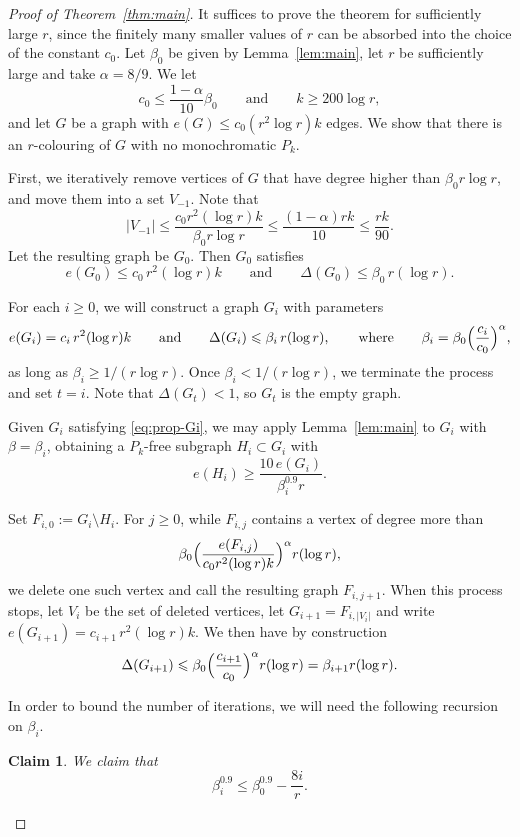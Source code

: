\documentclass[12pt,reqno]{amsart}
\newtheorem{claim}[theorem]{Claim}
\theoremstyle{remark}
\numberwithin{theorem}{section}
\renewcommand{\(}{\bigl(}
\renewcommand{\)}{\bigr)\vphantom{)}}
\renewcommand{\leq}{\le}
\renewcommand{\geq}{\ge}
\renewcommand{\le}{\leqslant}
\renewcommand{\ge}{\geqslant}
\begin{document}
\begin{proof}[Proof of Theorem~\ref{thm:main}] It suffices to prove the theorem for sufficiently large $r$, since the finitely many smaller values of $r$ can be absorbed into the choice of the constant $c_0$. Let $\beta_0$ be given by Lemma~\ref{lem:main}, let $r$ be sufficiently large  and take $\alpha=8/9$. We let
\[ c_0 \leq  \frac{1-\alpha}{10}\beta_0 \qquad \text{and} \qquad k \geq 200\log r,\]
and let $G$ be a graph with $e(G)\leq c_0(r^2\log r)k$ edges. We show that there is an $r$-colouring of $G$ with no monochromatic $P_k$.

First, we iteratively remove vertices of $G$ that have degree higher than $\beta_0r\log r$, and move them into a set $V_{-1}$. Note that
\[|V_{-1}|\leq\frac{c_0r^2(\log r)k}{\beta_0r\log r}\leq \frac{(1-\alpha)rk}{10}\leq \frac{rk}{90}.\]
Let the resulting graph be $G_0$. Then $G_0$ satisfies
\[e(G_0)\leq c_0\, r^2(\log r)k\qquad\text{and}\qquad
\Delta(G_0)\leq \beta_0\, r(\log r).\]

For each $i\geq 0$, we will construct a graph $G_i$ with parameters
\begin{equation}\label{eq:prop-Gi} e(G_i)=c_i\, r^2(\log r)k
\qquad\text{and}\qquad
\Delta(G_i)\leq \beta_i\, r(\log r), \qquad\text{where}\qquad \beta_i=\beta_0\Bigl(\frac{c_i}{c_0}\Bigr)^\alpha,\end{equation}
as long as $\beta_i\geq1/(r\log r)$. Once $\beta_i<1/(r\log r)$, we terminate the process and set $t=i$. Note that $\Delta(G_t)<1$, so $G_t$ is the empty graph.

Given $G_i$ satisfying \eqref{eq:prop-Gi}, we may apply Lemma~\ref{lem:main} to $G_i$ with $\beta=\beta_i$, obtaining a $P_k$-free subgraph $H_i\subset G_i$ with
\[e(H_i)\geq \frac{10\,e(G_i)}{\beta_i^{0.9}r}.\]

Set $F_{i,0}:=G_i\setminus H_i$. For $j\geq 0$, while $F_{i,j}$ contains a vertex of degree more than
\[\beta_0\Bigl(\frac{e(F_{i,j})}{c_0 r^2(\log r)k}\Bigr)^\alpha r(\log r),\]
we delete one such vertex and call the resulting graph $F_{i,j+1}$.
When this process stops, let $V_i$ be the set of deleted vertices, let $G_{i+1}=F_{i,|V_i|}$ and write $e(G_{i+1})=c_{i+1}\,r^2(\log r)k$. We
 then have by construction
\[\Delta(G_{i+1})\leq \beta_0\Bigl(\frac{c_{i+1}}{c_0}\Bigr)^\alpha r(\log r)
=\beta_{i+1}r(\log r).\]

In order to bound the number of iterations, we will need the following recursion on $\beta_i$.

\begin{claim}\label{claim:ci}
    We claim that 
    \[\beta_i^{0.9}\leq \beta_0^{0.9}-\frac{8 i}{r}.\]
\end{claim}


\end{proof}
\end{document}
